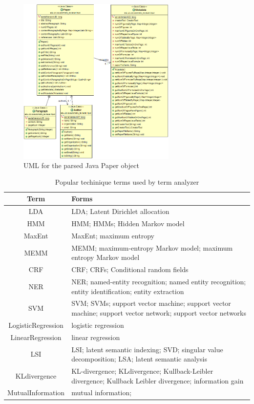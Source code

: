 \documentclass[11pt,letterpaper]{article}
\begin{document}
\begin{figure}[htb]
  \centering
	 	 \includegraphics[width=0.7\textwidth]{materials/paper_uml.png}
		\caption{UML for the parsed Java Paper object}
		\label{fig:uml}
\end{figure}


\begin{table}
\begin{center}
\begin{tabular}{|c|p{4cm}|}
\hline 
Term & Forms\\ \hline 
LDA	& LDA; Latent Dirichlet allocation\\ \hline 
HMM	& HMM; HMMs; Hidden Markov model\\ \hline 
MaxEnt	&MaxEnt; maximum entropy\\ \hline 
MEMM &	MEMM; maximum-entropy Markov model; maximum entropy Markov model\\ \hline 
CRF	& CRF; CRFs; Conditional random fields\\ \hline 
NER	& NER; named-entity recognition; named entity recognition; entity identification; entity extraction\\ \hline 
SVM	& SVM; SVMs; support vector machine; support vector machine; support vector network; support vector networks\\ \hline 
LogisticRegression	& logistic regression \\ \hline 
LinearRegression	&linear regression\\ \hline 
LSI &	LSI; latent semantic indexing; SVD; singular value decomposition; LSA; latent semantic analysis\\ \hline 
KLdivergence &	KL-divergence; KLdivergence; Kullback-Leibler divergence; Kullback Leibler divergence; information gain\\ \hline 
MutualInformation&	mutual information;\\ \hline 
\end{tabular}
\end{center}
\caption{Popular techinique terms used by term analyzer}
\label{tab:terms}
\end{table}
\end{document}
